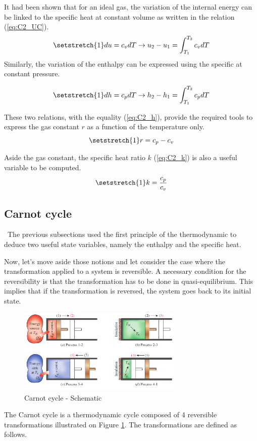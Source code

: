 It had been shown that for an ideal gas, the variation of the internal energy can be linked to the specific heat at constant volume as written in the relation (\ref{eq:C2_UC}).
\begin{equation}
\setstretch{1}
du = c_vdT \rightarrow u_2 - u_1 = \int_{T_1}^{T_2} c_vdT\label{eq:C2_UC}
\end{equation} 
Similarly, the variation of the enthalpy can be expressed using the specific at constant pressure.

\begin{equation}
\setstretch{1}
dh = c_pdT \rightarrow h_2 - h_1 = \int_{T_1}^{T_2} c_pdT\label{eq:C2_UP}
\end{equation} 

These two relations, with the equality (\ref{eq:C2_h}), provide the required tools to express the gas constant $r$ as a function of the temperature only. 
\begin{equation}
\setstretch{1}
r = c_p - c_v \label{eq:C2_r}
\end{equation}

Aside the gas constant, the specific heat ratio $k$ (\ref{eq:C2_k}) is also a useful variable to be computed.
\begin{equation}
\setstretch{1}
k = \frac{c_p}{c_v} \label{eq:C2_k}
\end{equation}
\subsection{Carnot cycle}
\quad\, The previous subsections used the first principle of the thermodynamic to deduce two useful state variables, namely the enthalpy and the specific heat.

Now, let's move aside those notions and let consider the case where the transformation applied to a system is reversible. A necessary condition for the reversibility is that the transformation has to be done in quasi-equilibrium. This implies that if the transformation is reversed, the system goes back to its initial state.


\begin{figure}[h]
\centering
\includegraphics[width=0.7\textwidth]{Carnot_schema.png}
\caption{Carnot cycle - Schematic \cite{2015}}
\label{fig:C2_Carnot}
\end{figure}
The Carnot cycle is a thermodynamic cycle composed of 4 reversible transformations illustrated on Figure \ref{fig:C2_Carnot}. The transformations are defined as follows.

